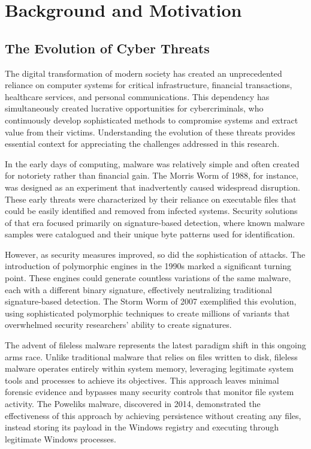 \section{Background and Motivation}
\label{sec:background}

\subsection{The Evolution of Cyber Threats}
\label{subsec:cyber_evolution}

The digital transformation of modern society has created an unprecedented reliance on computer systems for critical infrastructure, financial transactions, healthcare services, and personal communications. This dependency has simultaneously created lucrative opportunities for cybercriminals, who continuously develop sophisticated methods to compromise systems and extract value from their victims. Understanding the evolution of these threats provides essential context for appreciating the challenges addressed in this research.

In the early days of computing, malware was relatively simple and often created for notoriety rather than financial gain. The Morris Worm of 1988, for instance, was designed as an experiment that inadvertently caused widespread disruption. These early threats were characterized by their reliance on executable files that could be easily identified and removed from infected systems. Security solutions of that era focused primarily on signature-based detection, where known malware samples were catalogued and their unique byte patterns used for identification.

However, as security measures improved, so did the sophistication of attacks. The introduction of polymorphic engines in the 1990s marked a significant turning point. These engines could generate countless variations of the same malware, each with a different binary signature, effectively neutralizing traditional signature-based detection. The Storm Worm of 2007 exemplified this evolution, using sophisticated polymorphic techniques to create millions of variants that overwhelmed security researchers' ability to create signatures.

The advent of fileless malware represents the latest paradigm shift in this ongoing arms race. Unlike traditional malware that relies on files written to disk, fileless malware operates entirely within system memory, leveraging legitimate system tools and processes to achieve its objectives. This approach leaves minimal forensic evidence and bypasses many security controls that monitor file system activity. The Poweliks malware, discovered in 2014, demonstrated the effectiveness of this approach by achieving persistence without creating any files, instead storing its payload in the Windows registry and executing through legitimate Windows processes.

